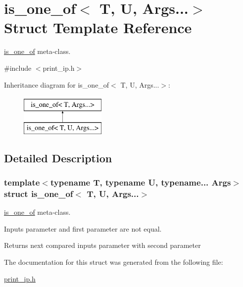 \hypertarget{structis__one__of_3_01T_00_01U_00_01Args_8_8_8_4}{\section{is\-\_\-one\-\_\-of$<$ T, U, Args...$>$ Struct Template Reference}
\label{structis__one__of_3_01T_00_01U_00_01Args_8_8_8_4}
}


\hyperlink{structis__one__of}{is\-\_\-one\-\_\-of} meta-\/class.  




{\ttfamily \#include $<$print\-\_\-ip.\-h$>$}

Inheritance diagram for is\-\_\-one\-\_\-of$<$ T, U, Args...$>$\-:\begin{figure}[H]
\begin{center}
\leavevmode
\includegraphics[height=2.000000cm]{structis__one__of_3_01T_00_01U_00_01Args_8_8_8_4}
\end{center}
\end{figure}


\subsection{Detailed Description}
\subsubsection*{template$<$typename T, typename U, typename... Args$>$struct is\-\_\-one\-\_\-of$<$ T, U, Args...$>$}

\hyperlink{structis__one__of}{is\-\_\-one\-\_\-of} meta-\/class. 

Inputs parameter and first parameter are not equal. \begin{DoxyReturn}{Returns}
next compared inputs parameter with second parameter 
\end{DoxyReturn}


The documentation for this struct was generated from the following file\-:\begin{DoxyCompactItemize}
\item 
\hyperlink{print__ip_8h}{print\-\_\-ip.\-h}\end{DoxyCompactItemize}
